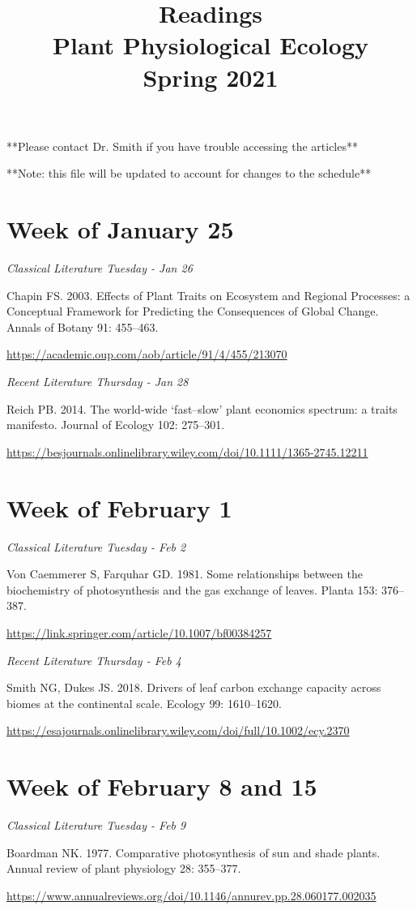 \documentclass[12pt, notitlepage]{article}   	%
\title{
	\textbf{
		Readings
	} \\
	\large Plant Physiological Ecology \\
	\large Spring 2021
}
\date{\vspace{-5ex}}
\begin{document}
{\selectfont %

\maketitle

**Please contact Dr. Smith if you have trouble accessing the articles**

**Note: this file will be updated to account for changes to the schedule**

\section*{Week of January 25}
\textit{Classical Literature Tuesday - Jan 26} \par
Chapin FS. 2003. Effects of Plant Traits on Ecosystem and Regional Processes: 
a Conceptual Framework for Predicting the Consequences of Global Change. 
Annals of Botany 91: 455–463. \par
\url{https://academic.oup.com/aob/article/91/4/455/213070}

\textit{Recent Literature Thursday - Jan 28} \par
Reich PB. 2014. The world-wide ‘fast–slow’ plant economics spectrum: a traits manifesto. 
Journal of Ecology 102: 275–301. \par
\url{https://besjournals.onlinelibrary.wiley.com/doi/10.1111/1365-2745.12211}
\par

\section*{Week of February 1}
\textit{Classical Literature Tuesday - Feb 2} \par
Von Caemmerer S, Farquhar GD. 1981. Some relationships between the biochemistry of 
photosynthesis and the gas exchange of leaves. Planta 153: 376–387. \par
\url{https://link.springer.com/article/10.1007/bf00384257}

\textit{Recent Literature Thursday - Feb 4} \par
Smith NG, Dukes JS. 2018. Drivers of leaf carbon exchange capacity across biomes at 
the continental scale. Ecology 99: 1610–1620. \par
\url{https://esajournals.onlinelibrary.wiley.com/doi/full/10.1002/ecy.2370}

\section*{Week of February 8 and 15}
\textit{Classical Literature Tuesday - Feb 9} \par
Boardman NK. 1977. Comparative photosynthesis of sun and shade plants. 
Annual review of plant physiology 28: 355–377. \par
\url{https://www.annualreviews.org/doi/10.1146/annurev.pp.28.060177.002035}

}
\end{document}
